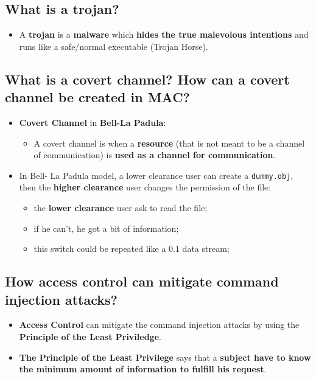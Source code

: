 \documentclass[9pt, letterpaper]{article}
\begin{document}
\subsection{What is a trojan?}
\begin{itemize}
	\item A \textbf{trojan} is a \textbf{malware} which \textbf{hides the true malevolous intentions} and runs like a safe/normal executable (Trojan Horse).
\end{itemize}

\subsection{What is a covert channel? How can a covert channel be created in MAC?}
\begin{itemize}
	\item \textbf{Covert Channel} in \textbf{Bell-La Padula}:
	\begin{itemize}
		\item  A covert channel is when a \textbf{resource} (that is not meant to be a channel of communication) is \textbf{used as a channel for communication}.
	\end{itemize}
	\item In Bell- La Padula model, a lower clearance user can create a {\tt dummy.obj}, then the \textbf{higher clearance} user changes the permission of the file:
	\begin{itemize}
		\item the \textbf{lower clearance} user ask to read the file;
		\item if he can't, he got a bit of information;
		\item this switch could be repeated like a $0.1$ data stream;
	\end{itemize}
\end{itemize}

\subsection{How access control can mitigate command injection attacks?}
\begin{itemize}
	\item \textbf{Access Control} can mitigate the command injection attacks by using the \textbf{Principle of the Least Priviledge}.
	\item \textbf{The Principle of the Least Privilege} says that a \textbf{subject have to know the minimum amount of information to fulfill his request}.
\end{itemize}
\end{document}
